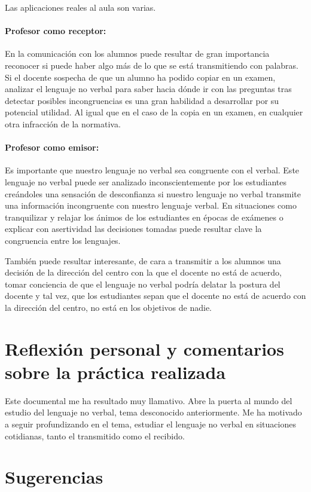 \documentclass[palatino,nochap]{apuntesURJC}
\begin{document}
Las aplicaciones reales al aula son varias.

\paragraph{Profesor como receptor:}
%
En la comunicación con los alumnos puede resultar de gran importancia reconocer si puede haber algo más de lo que se  está transmitiendo con palabras.
%
Si el docente sospecha de que un alumno ha podido copiar en un examen, analizar el lenguaje no verbal para saber hacia dónde ir con las preguntas tras detectar posibles incongruencias es una gran habilidad a desarrollar por su potencial utilidad.
%
Al igual que en el caso de la copia en un examen, en cualquier otra infracción de la normativa.

\paragraph{Profesor como emisor:}
%
Es importante que nuestro lenguaje no verbal sea congruente con el verbal.
%
Este lenguaje no verbal puede ser analizado inconscientemente por los estudiantes creándoles una sensación de desconfianza si nuestro lenguaje no verbal transmite una información incongruente con nuestro lenguaje verbal.
%
En situaciones como tranquilizar y relajar los ánimos de los estudiantes en épocas de exámenes o explicar con asertividad las decisiones tomadas puede resultar clave la congruencia entre los lenguajes.

También puede resultar interesante, de cara a transmitir a los alumnos una decisión de la dirección del centro con la que el docente no está de acuerdo, tomar conciencia de que el lenguaje no verbal podría delatar la postura del docente y tal vez, que los estudiantes sepan que el docente no está de acuerdo con la dirección del centro, no está en los objetivos de nadie.



\section{Reflexión personal y comentarios sobre la práctica realizada}

Este documental me ha resultado muy llamativo.
%
Abre la puerta al mundo del estudio del lenguaje no verbal, tema desconocido anteriormente.
%
Me ha motivado a seguir profundizando en el tema, estudiar el lenguaje no verbal en situaciones cotidianas, tanto el transmitido como el recibido.

\section{Sugerencias}



%
%

\printindex
\end{document}
